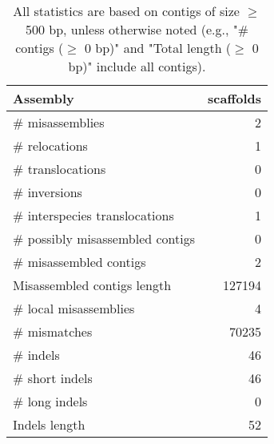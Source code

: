 \documentclass[12pt,a4paper]{article}
\begin{document}
\begin{table}[ht]
\begin{center}
\caption{All statistics are based on contigs of size $\geq$ 500 bp, unless otherwise noted (e.g., "\# contigs ($\geq$ 0 bp)" and "Total length ($\geq$ 0 bp)" include all contigs).}
\begin{tabular}{|l*{1}{|r}|}
\hline
Assembly & scaffolds \\ \hline
\# misassemblies & 2 \\ \hline
\hspace{5mm}\# relocations & 1 \\ \hline
\hspace{5mm}\# translocations & 0 \\ \hline
\hspace{5mm}\# inversions & 0 \\ \hline
\hspace{5mm}\# interspecies translocations & 1 \\ \hline
\# possibly misassembled contigs & 0 \\ \hline
\# misassembled contigs & 2 \\ \hline
Misassembled contigs length & 127194 \\ \hline
\# local misassemblies & 4 \\ \hline
\# mismatches & 70235 \\ \hline
\# indels & 46 \\ \hline
\hspace{5mm}\# short indels & 46 \\ \hline
\hspace{5mm}\# long indels & 0 \\ \hline
Indels length & 52 \\ \hline
\end{tabular}
\end{center}
\end{table}
\end{document}
